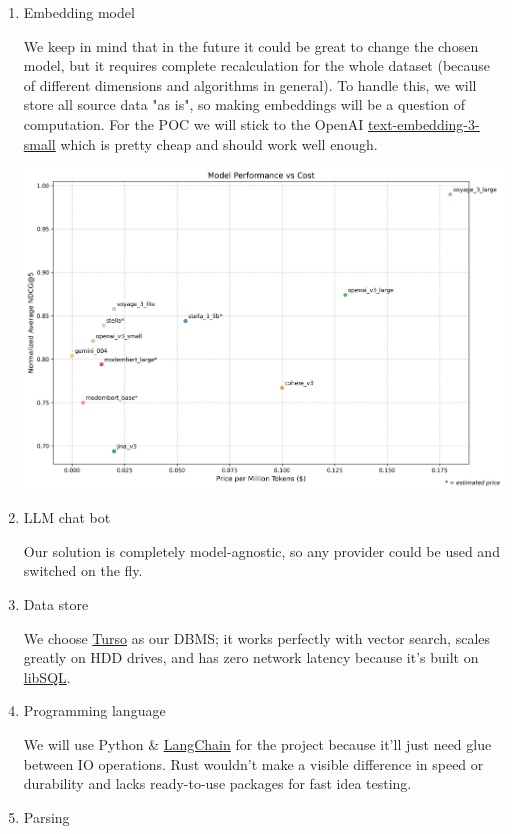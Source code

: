 \documentclass[11pt]{article}
\begin{document}
\begin{enumerate}
\item Embedding model
\label{sec:org92a7a53}

We keep in mind that in the future it could be great to change the chosen model, but it requires complete recalculation for the whole dataset (because of different dimensions and algorithms in general). To handle this, we will store all source data "as is", so making embeddings will be a question of computation.
For the POC we will stick to the OpenAI \href{https://platform.openai.com/docs/guides/embeddings\#embedding-models}{text-embedding-3-small} which is pretty cheap and should work well enough.

\begin{center}
\includegraphics[width=.9\linewidth]{img/embedding-model-pricing.png}
\end{center}
\item LLM chat bot
\label{sec:org7b47951}

Our solution is completely model-agnostic, so any provider could be used and switched on the fly.
\item Data store
\label{sec:org6bc0f34}

We choose \href{https://docs.turso.tech/introduction}{Turso} as our DBMS; it works perfectly with vector search, scales greatly on HDD drives, and has zero network latency because it's built on \href{https://github.com/tursodatabase/libsql/}{libSQL}.
\item Programming language
\label{sec:orgc7cbe91}

We will use Python \& \href{https://www.langchain.com/langchain}{LangChain} for the project because it'll just need glue between IO operations. Rust wouldn't make a visible difference in speed or durability and lacks ready-to-use packages for fast idea testing.
\item Parsing
\label{sec:orge0bb709}


\end{enumerate}
\end{document}
